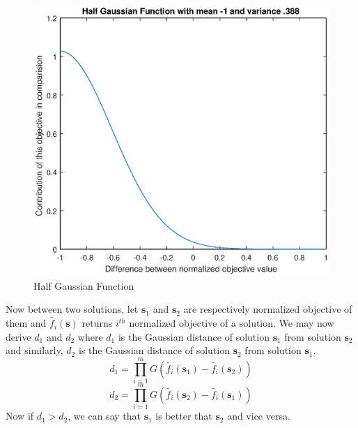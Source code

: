 \documentclass[letterpaper, 10 pt, conference]{ieeeconf}  %
\begin{document}
\begin{figure} [!h] \label{fig:gaussian}
  \includegraphics[width=\linewidth]{gaussian.eps}
  
  \caption{Half Gaussian Function}
\end{figure}
Now between two solutions, let $\mathbf{s}_1$ and $\mathbf{s}_2$ are respectively normalized objective of them and $ \tilde{f_i}(\mathbf{s})$
returns $i^{th}$ normalized objective of a solution.  We  may now derive $d_1$ and $d_2$ where $d_1$ is the Gaussian distance of solution $\mathbf{s}_1$ from solution $\mathbf{s}_2$ and similarly, $d_2$ is the Gaussian distance of solution $\mathbf{s}_2$ from solution $\mathbf{s}_1$.
\begin{equation}
    d_1=\prod_{i=1}^{m}G( \tilde{f_i}(\mathbf{s}_1)-\tilde{f_i}(\mathbf{s}_2)) 
\end{equation}
\begin{equation}
    d_2=\prod_{i=1}^{m}G( \tilde{f_i}(\mathbf{s}_2)-\tilde{f_i}(\mathbf{s}_1))
\end{equation}
Now if $d_1 > d_2$, we can say that $\mathbf{s}_1$ is better that $\mathbf{s}_2$ and vice versa.
\end{document}
